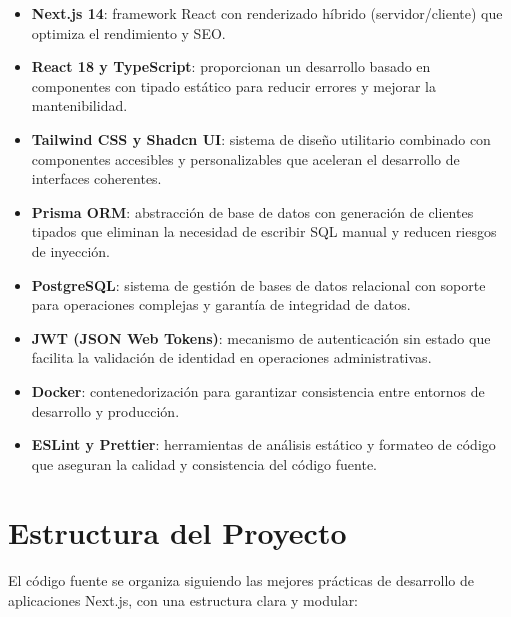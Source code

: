 \documentclass[12pt,a4paper]{report}
\begin{document}
\begin{itemize}[leftmargin=*]
    \item \textbf{Next.js 14}: framework React con renderizado híbrido (servidor/cliente) que optimiza el rendimiento y SEO.
    
    \item \textbf{React 18 y TypeScript}: proporcionan un desarrollo basado en componentes con tipado estático para reducir errores y mejorar la mantenibilidad.
    
    \item \textbf{Tailwind CSS y Shadcn UI}: sistema de diseño utilitario combinado con componentes accesibles y personalizables que aceleran el desarrollo de interfaces coherentes.
    
    \item \textbf{Prisma ORM}: abstracción de base de datos con generación de clientes tipados que eliminan la necesidad de escribir SQL manual y reducen riesgos de inyección.
    
    \item \textbf{PostgreSQL}: sistema de gestión de bases de datos relacional con soporte para operaciones complejas y garantía de integridad de datos.
    
    \item \textbf{JWT (JSON Web Tokens)}: mecanismo de autenticación sin estado que facilita la validación de identidad en operaciones administrativas.
    
    \item \textbf{Docker}: contenedorización para garantizar consistencia entre entornos de desarrollo y producción.
    
    \item \textbf{ESLint y Prettier}: herramientas de análisis estático y formateo de código que aseguran la calidad y consistencia del código fuente.
\end{itemize}

\chapter{Estructura del Proyecto}
El código fuente se organiza siguiendo las mejores prácticas de desarrollo de aplicaciones Next.js, con una estructura clara y modular:
\end{document}
